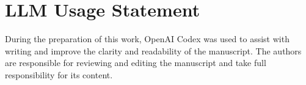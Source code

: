 \documentclass[10pt,twocolumn,letterpaper]{article}
\begin{document}
\clearpage
\section*{LLM Usage Statement}
During the preparation of this work, OpenAI Codex was used to assist with writing and improve the clarity and readability of the manuscript. The authors are responsible for reviewing and editing the manuscript and take full responsibility for its content.
{\small


}
\clearpage
\setcounter{page}{1}
\maketitlesupplementary
\appendix
{}
\makeatletter
{}
\renewcommand\thefigure{\thesection.\arabic{figure}}
\renewcommand\thetable{\thesection.\arabic{table}}
\renewcommand\theHfigure{\thesection.\arabic{figure}}
\renewcommand\theHtable{\thesection.\arabic{table}}
\makeatother

\end{document}
